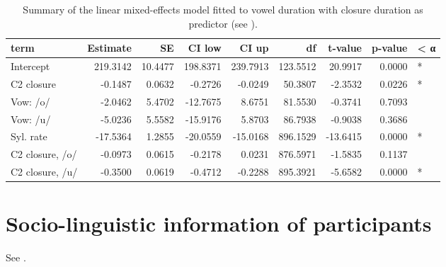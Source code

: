 \documentclass[preprint]{JASAnew}
\begin{document}
\begin{table}

\caption{\label{tab:vow-clo-table}Summary of the linear mixed-effects model fitted to vowel duration with closure duration as predictor (see ).}
\centering
\begin{tabular}[t]{lrrrrrrrl}
\toprule
term & Estimate & SE & CI low & CI up & df & t-value & p-value & < α\\
\midrule
Intercept & 219.3142 & 10.4477 & 198.8371 & 239.7913 & 123.5512 & 20.9917 & 0.0000 & *\\
C2 closure & -0.1487 & 0.0632 & -0.2726 & -0.0249 & 50.3807 & -2.3532 & 0.0226 & *\\
Vow: /o/ & -2.0462 & 5.4702 & -12.7675 & 8.6751 & 81.5530 & -0.3741 & 0.7093 & \\
Vow: /u/ & -5.0236 & 5.5582 & -15.9176 & 5.8703 & 86.7938 & -0.9038 & 0.3686 & \\
Syl. rate & -17.5364 & 1.2855 & -20.0559 & -15.0168 & 896.1529 & -13.6415 & 0.0000 & *\\
\addlinespace
C2 closure, /o/ & -0.0973 & 0.0615 & -0.2178 & 0.0231 & 876.5971 & -1.5835 & 0.1137 & \\
C2 closure, /u/ & -0.3500 & 0.0619 & -0.4712 & -0.2288 & 895.3921 & -5.6582 & 0.0000 & *\\
\bottomrule
\end{tabular}
\end{table}

\section{Socio-linguistic information of
participants}\label{socio-linguistic-information-of-participants}

\label{a:socioling}

See .
\end{document}
